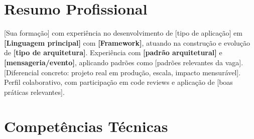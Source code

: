 \documentclass[a4paper,10pt]{article}
\begin{document}
\section*{Resumo Profissional}

[Sua formação] com experiência no desenvolvimento de [tipo de aplicação] em \textbf{[Linguagem principal]} com \textbf{[Framework]}, atuando na construção e evolução de \textbf{[tipo de arquitetura]}. Experiência com \textbf{[padrão arquitetural]} e \textbf{[mensageria/evento]}, aplicando padrões como [padrões relevantes da vaga]. [Diferencial concreto: projeto real em produção, escala, impacto mensurável]. Perfil colaborativo, com participação em code reviews e aplicação de [boas práticas relevantes].


%
%
%

\section*{Competências Técnicas}
\end{document}

